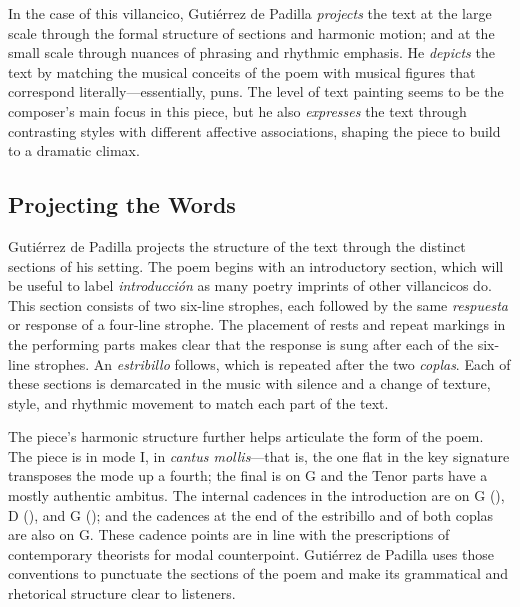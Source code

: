In the case of this villancico, Gutiérrez de Padilla \emph{projects} the text at
the large scale through the formal structure of sections and harmonic motion;
and at the small scale through nuances of phrasing and rhythmic emphasis.
He \emph{depicts} the text by matching the musical conceits of the poem with
musical figures that correspond literally---essentially, puns.
The level of text painting seems to be the composer's main focus in this piece,
but he also \emph{expresses} the text through contrasting styles with different
affective associations, shaping the piece to build to a dramatic climax.

\subsection{Projecting the Words}

Gutiérrez de Padilla projects the structure of the text through the distinct
sections of his setting.
The poem begins with an introductory section, which will be useful to label
\emph{introducción} as many poetry imprints of other villancicos do.
This section consists of two six-line strophes, each followed by the same
\emph{respuesta} or response of a four-line strophe.
The placement of rests and repeat markings in the performing parts makes clear
that the response is sung after each of the six-line strophes.
An \emph{estribillo} follows, which is repeated after the two \emph{coplas}.
Each of these sections is demarcated in the music with silence and a change of
texture, style, and rhythmic movement to match each part of the text.

The piece's harmonic structure further helps articulate the form of the poem.
The piece is in mode I, in \emph{cantus mollis}---that is, the one flat in the
key signature transposes the mode up a fourth; the final is on G and the Tenor
parts have a mostly authentic ambitus.
The internal cadences in the introduction are on G (), D
(), and G (); and the cadences at the end of the
estribillo and of both coplas are also on G.
These cadence points are in line with the prescriptions of contemporary
theorists for modal counterpoint.%
    \Autocites
    [873--882, 883--885, 907--912]{Cerone:Melopeo}
    [364--406]{Judd:RenaissanceModalTheory}
    {Barnett:TonalOrganization17C}
Gutiérrez de Padilla uses those conventions to punctuate the sections of the
poem and make its grammatical and rhetorical structure clear to listeners.

